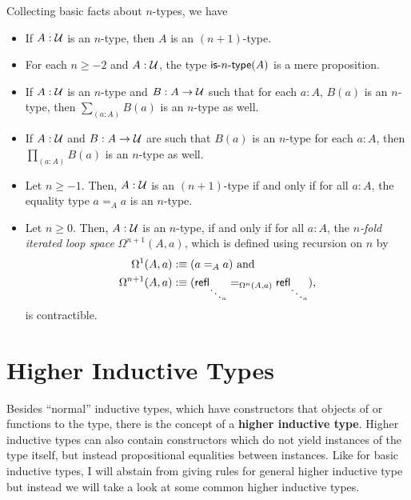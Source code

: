 Collecting basic facts about $n$-types, we have
\begin{lemma}
\begin{itemize}
\item If $A : \mathcal{U}$ is an $n$-type, then $A$ is an $(n+1)$-type.
\item For each $n \geq -2$ and $A : \mathcal{U}$, the type $\mathsf{is}\mbox{-}{n}\mbox{-}\mathsf{type}(A)$ is a mere
proposition.
\item If $A : \mathcal{U}$ is an $n$-type and $B : A \to \mathcal{U}$ such that for each $a : A$,
$B(a)$ is an $n$-type, then $\sum_{(a : A)} B(a)$ is an $n$-type as well.
\item If $A : \mathcal{U}$ and $B : A \to \mathcal{U}$ are such that $B(a)$ is an $n$-type for each
$a : A$, then $\prod_{(a : A)} B(a)$ is an $n$-type as well.
\item Let $n \geq -1$. Then, $A : \mathcal{U}$ is an $(n+1)$-type if and only if for all $a : A$,
the equality type $a =_A a$ is an $n$-type.
\item Let $n \geq 0$. Then, $A : \mathcal{U}$ is an $n$-type, if and only if for all $a : A$,
the \emph{$n$-fold iterated loop space} $\Omega^{n+1}(A, a)$, which is defined using
recursion on $n$ by
\begin{align*}
\Omega^1(A, a) &:\equiv (a =_A a) \text{ and}\\
\Omega^{n+1}(A, a) &:\equiv (\mathsf{refl}_{\ddots_a} =_{\Omega^n(A,a)} \mathsf{refl}_{\ddots_a}) \text{,}
\end{align*}
is contractible.
\end{itemize}
\end{lemma}

\section{Higher Inductive Types}

Besides ``normal'' inductive types, which have constructors that objects of or
functions to the type, there is the concept of a \textbf{higher inductive type}.
Higher inductive types can also contain constructors which do not yield instances
of the type itself, but instead propositional equalities between instances.
Like for basic inductive types, I will abstain from giving rules for general
higher inductive type but instead we will take a look at some common higher inductive
types.

